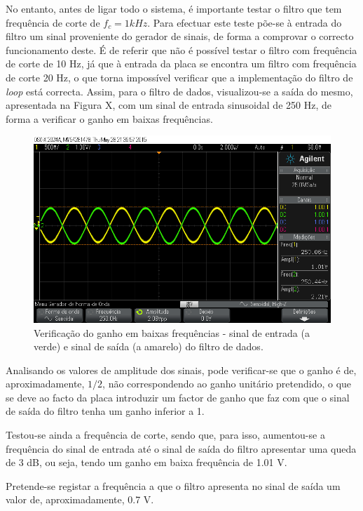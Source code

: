 \documentclass[11pt]{article}
\numberwithin{equation}{section}
\begin{document}
No entanto, antes de ligar todo o sistema, é importante testar o filtro que tem frequência de corte de $f_c = 1 kHz$. Para efectuar este teste põe-se à entrada do filtro um sinal proveniente do gerador de sinais, de forma a comprovar o correcto funcionamento deste. É de referir que não é possível testar o filtro com frequência de corte de 10 Hz, já que à entrada da placa se encontra um filtro com frequência de corte 20 Hz, o que torna impossível verificar que a implementação do filtro de \textit{loop} está correcta. Assim, para o filtro de dados, visualizou-se a saída do mesmo, apresentada na Figura X, com um sinal de entrada sinusoidal de 250 Hz, de forma a verificar o ganho em baixas frequências.

\begin{figure}[H]
	\centering
	\includegraphics[keepaspectratio=true, scale=0.37]{exps/filtro_1k_baixafreq}
	\caption{Verificação do ganho em baixas frequências - sinal de entrada (a verde) e sinal de saída (a amarelo) do filtro de dados.}
	\vspace{-0.8em}
\end{figure} 

Analisando os valores de amplitude dos sinais, pode verificar-se que o ganho é de, aproximadamente, $1/2$, não correspondendo ao ganho unitário pretendido, o que se deve ao facto da placa introduzir um factor de ganho que faz com que o sinal de saída do filtro tenha um ganho inferior a 1. 

Testou-se ainda a frequência de corte, sendo que, para isso, aumentou-se a frequência do sinal de entrada até o sinal de saída do filtro apresentar uma queda de 3 dB, ou seja, tendo um ganho em baixa frequência de 1.01 V. 

Pretende-se registar a frequência a que o filtro apresenta no sinal de saída um valor de, aproximadamente, 0.7 V.
\end{document}
